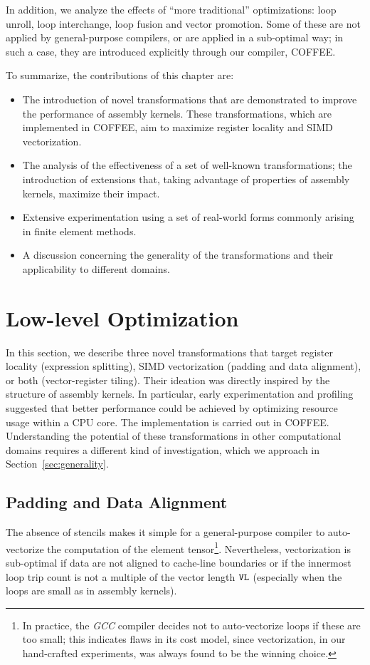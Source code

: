 In addition, we analyze the effects of ``more traditional'' optimizations: loop unroll, loop interchange, loop fusion and vector promotion. Some of these are not applied by general-purpose compilers, or are applied in a sub-optimal way; in such a case, they are introduced explicitly through our compiler, COFFEE. 

To summarize, the contributions of this chapter are:
\begin{itemize}
\item The introduction of novel transformations that are demonstrated to improve the performance of assembly kernels. These transformations, which are implemented in COFFEE, aim to maximize register locality and SIMD vectorization.
\item The analysis of the effectiveness of a set of well-known transformations; the introduction of extensions that, taking advantage of properties of assembly kernels, maximize their impact.
\item Extensive experimentation using a set of real-world forms commonly arising in finite element methods.
\item A discussion concerning the generality of the transformations and their applicability to different domains.
\end{itemize}

\section{Low-level Optimization}
\label{sec:lowlevelopt}

In this section, we describe three novel transformations that target register locality (expression splitting), SIMD vectorization (padding and data alignment), or both (vector-register tiling). Their ideation was directly inspired by the structure of assembly kernels. In particular, early experimentation and profiling suggested that better performance could be achieved by optimizing resource usage within a CPU core. The implementation is carried out in COFFEE. Understanding the potential of these transformations in other computational domains requires a different kind of investigation, which we approach in Section~\ref{sec:generality}. 

\subsection{Padding and Data Alignment}
\label{sec:coffee-padding}
The absence of stencils makes it simple for a general-purpose compiler to auto-vectorize the computation of the element tensor\footnote{In practice, the {\em GCC} compiler decides not to auto-vectorize loops if these are too small; this indicates flaws in its cost model, since vectorization, in our hand-crafted experiments, was always found to be the winning choice.}. Nevertheless, vectorization is sub-optimal if data are not aligned to cache-line boundaries or if the innermost loop trip count is not a multiple of the vector length $\mbox{\texttt{VL}}$ (especially when the loops are small as in assembly kernels). 

